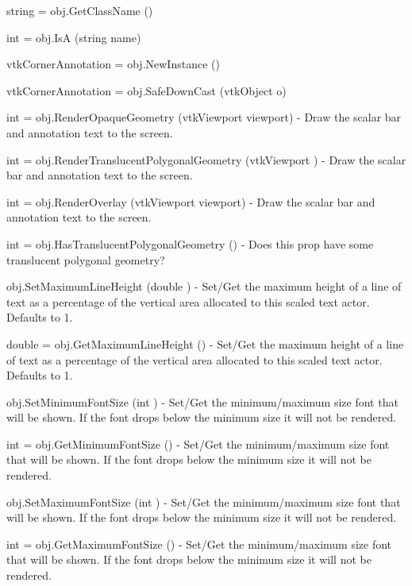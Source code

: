 \begin{DoxyItemize}
\item {\ttfamily string = obj.\-Get\-Class\-Name ()}  
\item {\ttfamily int = obj.\-Is\-A (string name)}  
\item {\ttfamily vtk\-Corner\-Annotation = obj.\-New\-Instance ()}  
\item {\ttfamily vtk\-Corner\-Annotation = obj.\-Safe\-Down\-Cast (vtk\-Object o)}  
\item {\ttfamily int = obj.\-Render\-Opaque\-Geometry (vtk\-Viewport viewport)} -\/ Draw the scalar bar and annotation text to the screen.  
\item {\ttfamily int = obj.\-Render\-Translucent\-Polygonal\-Geometry (vtk\-Viewport )} -\/ Draw the scalar bar and annotation text to the screen.  
\item {\ttfamily int = obj.\-Render\-Overlay (vtk\-Viewport viewport)} -\/ Draw the scalar bar and annotation text to the screen.  
\item {\ttfamily int = obj.\-Has\-Translucent\-Polygonal\-Geometry ()} -\/ Does this prop have some translucent polygonal geometry?  
\item {\ttfamily obj.\-Set\-Maximum\-Line\-Height (double )} -\/ Set/\-Get the maximum height of a line of text as a percentage of the vertical area allocated to this scaled text actor. Defaults to 1.  
\item {\ttfamily double = obj.\-Get\-Maximum\-Line\-Height ()} -\/ Set/\-Get the maximum height of a line of text as a percentage of the vertical area allocated to this scaled text actor. Defaults to 1.  
\item {\ttfamily obj.\-Set\-Minimum\-Font\-Size (int )} -\/ Set/\-Get the minimum/maximum size font that will be shown. If the font drops below the minimum size it will not be rendered.  
\item {\ttfamily int = obj.\-Get\-Minimum\-Font\-Size ()} -\/ Set/\-Get the minimum/maximum size font that will be shown. If the font drops below the minimum size it will not be rendered.  
\item {\ttfamily obj.\-Set\-Maximum\-Font\-Size (int )} -\/ Set/\-Get the minimum/maximum size font that will be shown. If the font drops below the minimum size it will not be rendered.  
\item {\ttfamily int = obj.\-Get\-Maximum\-Font\-Size ()} -\/ Set/\-Get the minimum/maximum size font that will be shown. If the font drops below the minimum size it will not be rendered.  

\end{DoxyItemize}
